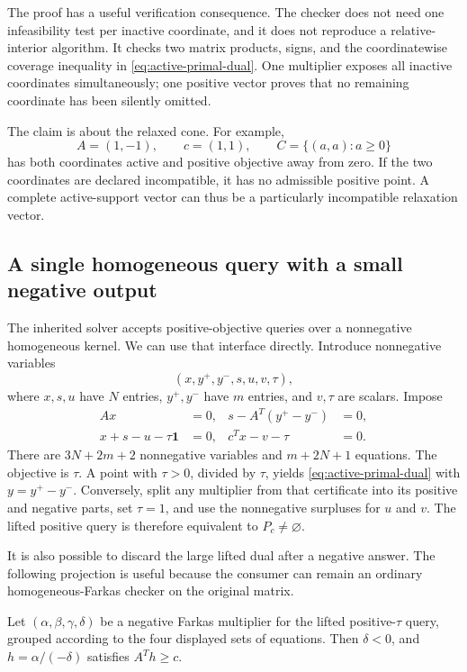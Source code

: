 The proof has a useful verification consequence.  The checker does not need
one infeasibility test per inactive coordinate, and it does not reproduce a
relative-interior algorithm.  It checks two matrix products, signs, and the
coordinatewise coverage inequality in \eqref{eq:active-primal-dual}.  One
multiplier exposes all inactive coordinates simultaneously; one positive
vector proves that no remaining coordinate has been silently omitted.

The claim is about the relaxed cone.  For example,
\[
 A=(1,-1),\qquad c=(1,1),\qquad C=\{(a,a):a\ge0\}
\]
has both coordinates active and positive objective away from zero.  If the
two coordinates are declared incompatible, it has no admissible positive
point.  A complete active-support vector can thus be a particularly
incompatible relaxation vector.

\subsection{A single homogeneous query with a small negative output}

The inherited solver accepts positive-objective queries over a nonnegative
homogeneous kernel.  We can use that interface directly.  Introduce
nonnegative variables
\[
 (x,y^+,y^-,s,u,v,\tau),
\]
where $x,s,u$ have $N$ entries, $y^+,y^-$ have $m$ entries, and $v,\tau$ are
scalars.  Impose
\begin{align}
 Ax&=0, &
 s-A^T(y^+-y^-)&=0,\label{eq:active-lift-a}\\
 x+s-u-\tau\mathbf1&=0, &
 c^Tx-v-\tau&=0.\label{eq:active-lift-b}
\end{align}
There are $3N+2m+2$ nonnegative variables and $m+2N+1$ equations.  The
objective is $\tau$.  A point with $\tau>0$, divided by $\tau$, yields
\eqref{eq:active-primal-dual} with $y=y^+-y^-$.  Conversely, split any
multiplier from that certificate into its positive and negative parts, set
$\tau=1$, and use the nonnegative surpluses for $u$ and $v$.  The lifted
positive query is therefore equivalent to $P_c\ne\varnothing$.

It is also possible to discard the large lifted dual after a negative
answer.  The following projection is useful because the consumer can remain
an ordinary homogeneous-Farkas checker on the original matrix.

\begin{proposition}
\label{prop:active-dual-projection}
Let $(\alpha,\beta,\gamma,\delta)$ be a negative Farkas multiplier for the
lifted positive-$\tau$ query, grouped according to the four displayed sets of
equations.  Then $\delta<0$, and $h=\alpha/(-\delta)$ satisfies
$A^Th\ge c$.
\end{proposition}

